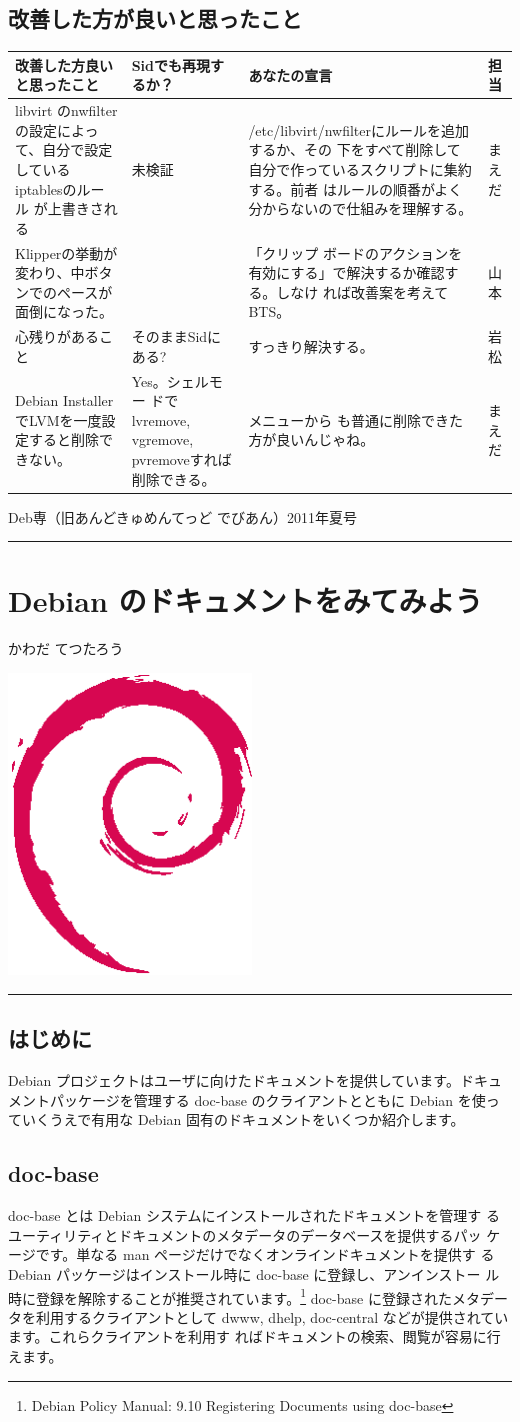 \documentclass[mingoth,a4paper]{jsarticle}
\renewcommand{\dancersection}[2]{%
\newpage
Deb専（旧あんどきゅめんてっど でびあん）2011年夏号
%
\vspace{0.1mm}\\
{\color{dancerdarkblue}\rule{\hsize}{2mm}}

%
%
\begin{minipage}[t]{0.6\hsize}
\color{dancerdarkblue}
\vspace{1cm}
\section{#1}
\hfill{}#2\\
\end{minipage}
\begin{minipage}[t]{0.4\hsize}
\vspace{-2cm}
\hfill{}\includegraphics[height=8cm]{image200502/openlogo-nd.eps}\\
\vspace{-5cm}
\end{minipage}
%
{\color{dancerlightblue}\rule{0.66\hsize}{2mm}}
%
\vspace{2cm}
}
\begin{document}
\subsection{改善した方が良いと思ったこと}

\begin{table}[H]
 \begin{center}
  \begin{tabular}{|p{15em}|p{12em}|p{15em}|p{3em}|}
   \hline
   改善した方良いと思ったこと & Sidでも再現するか？ & あなたの宣言 & 担
   当 \\
   \hline
   libvirt のnwfilterの設定によって、自分で設定しているiptablesのルール
   が上書きされる & 未検証 & /etc/libvirt/nwfilterにルールを追加するか、その
	   下をすべて削除して自分で作っているスクリプトに集約する。前者
	   はルールの順番がよく分からないので仕組みを理解する。 & まえだ\\
   \hline
   Klipperの挙動が変わり、中ボタンでのペースが面倒になった。& & 「クリップ
	   ボードのアクションを有効にする」で解決するか確認する。しなけ
	   れば改善案を考えてBTS。 & 山本\\
   \hline
   心残りがあること & そのままSidにある? & すっきり解決する。 & 岩松 \\
   \hline
   Debian InstallerでLVMを一度設定すると削除できない。& Yes。シェルモー
       ドでlvremove, vgremove, pvremoveすれば削除できる。 & メニューから
	   も普通に削除できた方が良いんじゃね。 & まえだ \\
   \hline
  \end{tabular}
 \end{center}
\end{table}

\dancersection{Debian のドキュメントをみてみよう}{かわだ てつたろう}
\subsection{はじめに}
Debian プロジェクトはユーザに向けたドキュメントを提供しています。ドキュ
メントパッケージを管理する doc-base のクライアントとともに Debian を使っ
ていくうえで有用な Debian 固有のドキュメントをいくつか紹介します。


\subsection{doc-base}
doc-base とは Debian システムにインストールされたドキュメントを管理す
るユーティリティとドキュメントのメタデータのデータベースを提供するパッ
ケージです。単なる man ページだけでなくオンラインドキュメントを提供す
る Debian パッケージはインストール時に doc-base に登録し、アンインストー
ル時に登録を解除することが推奨されています。\footnote{Debian Policy
 Manual: 9.10 Registering Documents using doc-base}
doc-base に登録されたメタデータを利用するクライアントとして dwww,
dhelp, doc-central などが提供されています。これらクライアントを利用す
ればドキュメントの検索、閲覧が容易に行えます。
\end{document}
